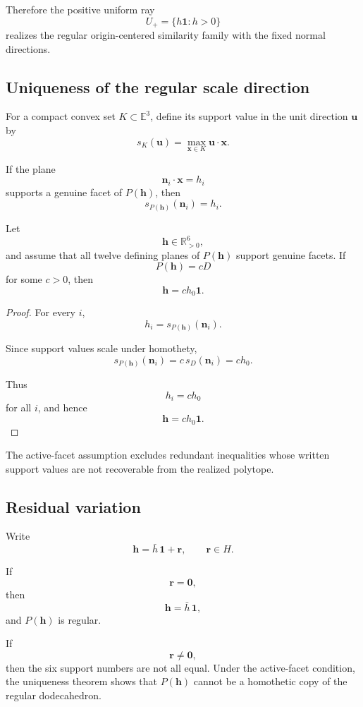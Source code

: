 Therefore the positive uniform ray
\[
U_+
=
\{h\mathbf 1:h>0\}
\]
realizes the regular origin-centered similarity family with the fixed
normal directions.

\subsection{Uniqueness of the regular scale direction}

For a compact convex set \(K\subset\mathbb E^3\), define its support value
in the unit direction \(\mathbf u\) by
\[
s_K(\mathbf u)
=
\max_{\mathbf x\in K}
\mathbf u\cdot\mathbf x.
\]

If the plane
\[
\mathbf n_i\cdot\mathbf x=h_i
\]
supports a genuine facet of \(P(\mathbf h)\), then
\[
s_{P(\mathbf h)}(\mathbf n_i)=h_i.
\]

\begin{theorem}
Let
\[
\mathbf h\in\mathbb R_{>0}^6,
\]
and assume that all twelve defining planes of \(P(\mathbf h)\) support
genuine facets. If
\[
P(\mathbf h)=cD
\]
for some \(c>0\), then
\[
\mathbf h=ch_0\mathbf 1.
\]
\end{theorem}

\begin{proof}
For every \(i\),
\[
h_i
=
s_{P(\mathbf h)}(\mathbf n_i).
\]

Since support values scale under homothety,
\[
s_{P(\mathbf h)}(\mathbf n_i)
=
c\,s_D(\mathbf n_i)
=
ch_0.
\]

Thus
\[
h_i=ch_0
\]
for all \(i\), and hence
\[
\mathbf h=ch_0\mathbf 1.
\]
\end{proof}

The active-facet assumption excludes redundant inequalities whose written
support values are not recoverable from the realized polytope.

\subsection{Residual variation}

Write
\[
\mathbf h
=
\bar h\,\mathbf 1+\mathbf r,
\qquad
\mathbf r\in H.
\]

If
\[
\mathbf r=\mathbf 0,
\]
then
\[
\mathbf h=\bar h\,\mathbf 1,
\]
and \(P(\mathbf h)\) is regular.

If
\[
\mathbf r\ne\mathbf 0,
\]
then the six support numbers are not all equal. Under the active-facet
condition, the uniqueness theorem shows that \(P(\mathbf h)\) cannot be a
homothetic copy of the regular dodecahedron.

